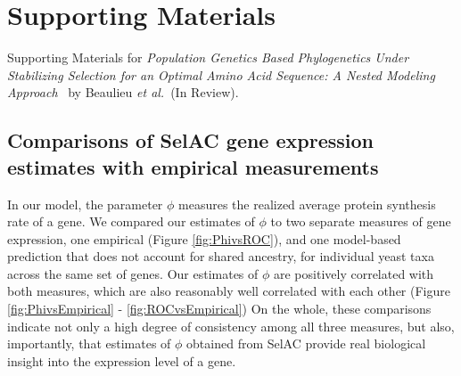 \documentclass[onecolumn,letterpaper,fleqn,nogrid]{myMBE}%
\begin{document}
\clearpage



\appendix

\setcounter{section}{19} %
\setcounter{page}{1}
\renewcommand{\thepage}{S\arabic{page}} %

\section{Supporting Materials}
Supporting Materials for \emph{Population Genetics Based Phylogenetics Under Stabilizing Selection for an Optimal Amino Acid Sequence: A Nested Modeling Approach} \ by Beaulieu \emph{et al.}~(In Review).

\subsection{Comparisons of SelAC gene expression estimates with empirical measurements}
In our model, the parameter $\phi$ measures the realized average protein synthesis rate of a gene.
We compared our estimates of $\phi$ to two separate measures of gene expression, one empirical (Figure \ref{fig:PhivsROC}), and one model-based prediction that does not account for shared ancestry, for individual yeast taxa across the same set of genes.
Our estimates of $\phi$ are positively correlated with both measures, which are also reasonably well correlated with each other (Figure \ref{fig:PhivsEmpirical} - \ref{fig:ROCvsEmpirical})
On the whole, these comparisons indicate not only a high degree of consistency among all three measures, but also, importantly, that estimates of $\phi$ obtained from SelAC provide real biological insight into the expression level of a gene.

\vfill
\end{document}
